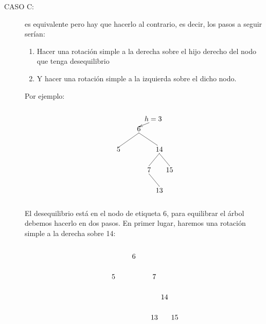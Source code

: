 \documentclass[10pt,a4paper,spanish]{report}
\begin{document}
\begin{description}
	\item[CASO C:] es equivalente pero hay que hacerlo al contrario, es decir, los pasos a seguir serían:
	\begin{enumerate}
		\item Hacer una rotación simple a la derecha sobre el hijo derecho del nodo que tenga desequilibrio
		\item Y hacer una rotación simple a la izquierda sobre el dicho nodo.
	\end{enumerate}

	\noindent
	Por ejemplo:

	\[\begin{xy}
	,(0,0)*+=<10mm>[]\txt<2cm>{6}
	,(7,5)*+=<10mm>[]\txt<2cm>{$h=3$}
	,(-10,-10)*+=<10mm>[]\txt<2cm>{5}
	,(10,-10)*+=<10mm>[]\txt<2cm>{14}
	,(5,-20)*+=<10mm>[]\txt<2cm>{7}
	,(15,-20)*+=<10mm>[]\txt<2cm>{15}
	,(10,-30)*+=<10mm>[]\txt<2cm>{13}

	\ar@{->} (5,3);(0,1)
	\ar@{-} (0,-2);(-10,-9) %
	\ar@{-} (0,-2);(9,-8) %
	\ar@{-} (10,-12);(5,-18) %
	\ar@{-} (10,-12);(15,-18) %
	\ar@{-} (5,-22);(10,-28)
	\end{xy}\]

	\noindent
	El desequilibrio está en el nodo de etiqueta 6, para equilibrar el árbol debemos hacerlo en dos pasos. En primer lugar, haremos una rotación simple a la derecha sobre 14:

	\[\begin{xy}
	,(0,0)*+=<10mm>[]\txt<2cm>{6}
	,(-10,-10)*+=<10mm>[]\txt<2cm>{5}
	,(10,-10)*+=<10mm>[]\txt<2cm>{7}
	,(15,-20)*+=<10mm>[]\txt<2cm>{14}
	,(10,-30)*+=<10mm>[]\txt<2cm>{13}
	,(20,-30)*+=<10mm>[]\txt<2cm>{15}


\end{xy}\]
\end{description}
\end{document}
